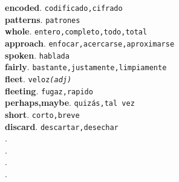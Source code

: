 \documentclass[twocolumn]{article}
\begin{document}
	\textsf{\textbf{encoded}}. \texttt{codificado,cifrado}\\
	\textsf{\textbf{patterns}}. \texttt{patrones}\\
	\textsf{\textbf{whole}}. \texttt{entero,completo,todo,total}\\
	\textsf{\textbf{approach}}. \texttt{enfocar,acercarse,aproximarse}\\
	\textsf{\textbf{spoken}}. \texttt{hablada}\\
	\textsf{\textbf{fairly}}. \texttt{bastante,justamente,limpiamente}\\
	\textsf{\textbf{fleet}}. \texttt{veloz{\scriptsize \textit{(adj)}}}\\
	\textsf{\textbf{fleeting}}. \texttt{fugaz,rapido}\\
	\textsf{\textbf{perhaps,maybe}}. \texttt{quiz\'as,tal vez}\\
	\textsf{\textbf{short}}. \texttt{corto,breve}\\
	\textsf{\textbf{discard}}. \texttt{descartar,desechar}\\
	\textsf{\textbf{}}. \texttt{}\\
	\textsf{\textbf{}}. \texttt{}\\
	\textsf{\textbf{}}. \texttt{}\\
	\textsf{\textbf{}}. \texttt{}\\
\end{document}
